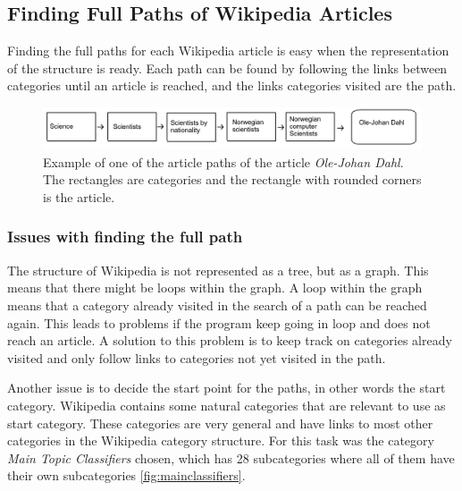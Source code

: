 \subsection{Finding Full Paths of Wikipedia Articles}
Finding the full paths for each Wikipedia article is easy when the representation of the structure is ready. Each path can be found by following the links between categories until an article is reached, and the links categories visited are the path. 

\begin{figure}[h]
\centering
\includegraphics[width=\textwidth]{Chapters/Implementation/example_path}
\caption[Example of an article path]{Example of one of the article paths of the article \emph{Ole-Johan Dahl}. The rectangles are categories and the rectangle with rounded corners is the article. }
\label{fig:examplepath}
\end{figure}

\subsubsection{Issues with finding the full path}
The structure of Wikipedia is not represented as a tree, but as a graph. This means that there might be loops within the graph. A loop within the graph means that a category already visited in the search of a path can be reached again. This leads to problems if the program keep going in loop and does not reach an article. A solution to this problem is to keep track on categories already visited and only follow links to categories not yet visited in the path. 

Another issue is to decide the start point for the paths, in other words the start category. Wikipedia contains some natural categories that are relevant to use as start category. These categories are very general and have links to most other categories in the Wikipedia category structure. For this task was the category \emph{Main Topic Classifiers} chosen, which has 28 subcategories where all of them have their own subcategories \ref{fig:mainclassifiers}\cite{wiki:specialtree}.

